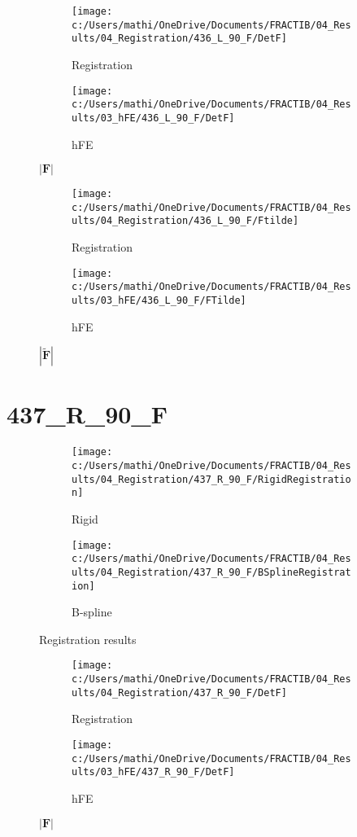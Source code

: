 \documentclass{article}%
\begin{document}
\begin{figure}[h!]%
\begin{subfigure}[b]{0.5\linewidth}%
\texttt{[image: c:/Users/mathi/OneDrive/Documents/FRACTIB/04\_Results/04\_Registration/436\_L\_90\_F/DetF]}%
\caption{Registration}%
\end{subfigure}%
\begin{subfigure}[b]{0.5\linewidth}%
\texttt{[image: c:/Users/mathi/OneDrive/Documents/FRACTIB/04\_Results/03\_hFE/436\_L\_90\_F/DetF]}%
\caption{hFE}%
\end{subfigure}%
\caption{$|\mathbf{F}|$}%
\end{figure}

%


\begin{figure}[h!]%
\begin{subfigure}[b]{0.5\linewidth}%
\texttt{[image: c:/Users/mathi/OneDrive/Documents/FRACTIB/04\_Results/04\_Registration/436\_L\_90\_F/Ftilde]}%
\caption{Registration}%
\end{subfigure}%
\begin{subfigure}[b]{0.5\linewidth}%
\texttt{[image: c:/Users/mathi/OneDrive/Documents/FRACTIB/04\_Results/03\_hFE/436\_L\_90\_F/FTilde]}%
\caption{hFE}%
\end{subfigure}%
\caption{$|\widetilde{\mathbf{F}}|$}%
\end{figure}

%
\newpage%
\section*{437\_R\_90\_F}%
\label{sec:437R90F}%


\begin{figure}[h!]%
\begin{subfigure}[b]{0.5\linewidth}%
\texttt{[image: c:/Users/mathi/OneDrive/Documents/FRACTIB/04\_Results/04\_Registration/437\_R\_90\_F/RigidRegistration]}%
\caption{Rigid}%
\end{subfigure}%
\begin{subfigure}[b]{0.5\linewidth}%
\texttt{[image: c:/Users/mathi/OneDrive/Documents/FRACTIB/04\_Results/04\_Registration/437\_R\_90\_F/BSplineRegistration]}%
\caption{B{-}spline}%
\end{subfigure}%
\caption{Registration results}%
\end{figure}

%


\begin{figure}[h!]%
\begin{subfigure}[b]{0.5\linewidth}%
\texttt{[image: c:/Users/mathi/OneDrive/Documents/FRACTIB/04\_Results/04\_Registration/437\_R\_90\_F/DetF]}%
\caption{Registration}%
\end{subfigure}%
\begin{subfigure}[b]{0.5\linewidth}%
\texttt{[image: c:/Users/mathi/OneDrive/Documents/FRACTIB/04\_Results/03\_hFE/437\_R\_90\_F/DetF]}%
\caption{hFE}%
\end{subfigure}%
\caption{$|\mathbf{F}|$}%
\end{figure}
\end{document}
